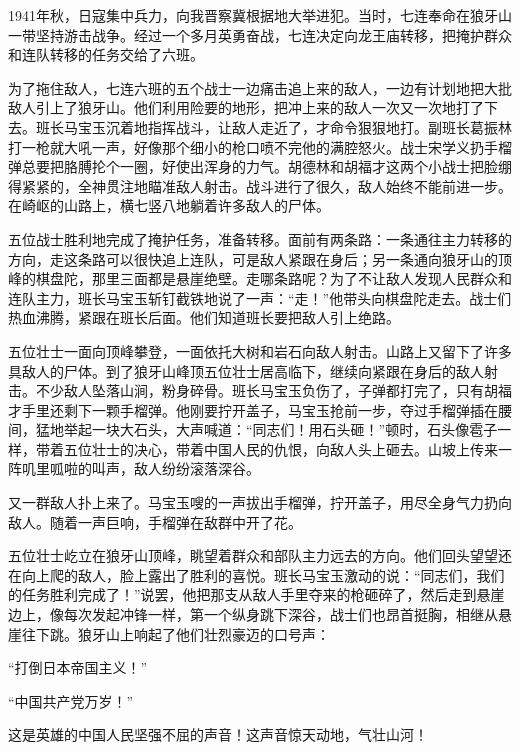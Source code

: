 \documentclass[12pt,UTF-8,openany]{ctexbook}
\begin{document}
\begin{large}
    
    1941年秋，日寇集中兵力，向我晋察冀根据地大举进犯。当时，七连奉命在狼牙山一带坚持游击战争。经过一个多月英勇奋战，七连决定向龙王庙转移，把掩护群众和连队转移的任务交给了六班。
    
    为了拖住敌人，七连六班的五个战士一边痛击追上来的敌人，一边有计划地把大批敌人引上了狼牙山。他们利用险要的地形，把冲上来的敌人一次又一次地打了下去。班长马宝玉沉着地指挥战斗，让敌人走近了，才命令狠狠地打。副班长葛振林打一枪就大吼一声，好像那个细小的枪口喷不完他的满腔怒火。战士宋学义扔手榴弹总要把胳膊抡个一圈，好使出浑身的力气。胡德林和胡福才这两个小战士把脸绷得紧紧的，全神贯注地瞄准敌人射击。战斗进行了很久，敌人始终不能前进一步。在崎岖的山路上，横七竖八地躺着许多敌人的尸体。
    
    五位战士胜利地完成了掩护任务，准备转移。面前有两条路：一条通往主力转移的方向，走这条路可以很快追上连队，可是敌人紧跟在身后；另一条通向狼牙山的顶峰的棋盘陀，那里三面都是悬崖绝壁。走哪条路呢？为了不让敌人发现人民群众和连队主力，班长马宝玉斩钉截铁地说了一声：“走！”他带头向棋盘陀走去。战士们热血沸腾，紧跟在班长后面。他们知道班长要把敌人引上绝路。
    
    五位壮士一面向顶峰攀登，一面依托大树和岩石向敌人射击。山路上又留下了许多具敌人的尸体。到了狼牙山峰顶五位壮士居高临下，继续向紧跟在身后的敌人射击。不少敌人坠落山涧，粉身碎骨。班长马宝玉负伤了，子弹都打完了，只有胡福才手里还剩下一颗手榴弹。他刚要拧开盖子，马宝玉抢前一步，夺过手榴弹插在腰间，猛地举起一块大石头，大声喊道：“同志们！用石头砸！”顿时，石头像雹子一样，带着五位壮士的决心，带着中国人民的仇恨，向敌人头上砸去。山坡上传来一阵叽里呱啦的叫声，敌人纷纷滚落深谷。
    
    又一群敌人扑上来了。马宝玉嗖的一声拔出手榴弹，拧开盖子，用尽全身气力扔向敌人。随着一声巨响，手榴弹在敌群中开了花。
    
    五位壮士屹立在狼牙山顶峰，眺望着群众和部队主力远去的方向。他们回头望望还在向上爬的敌人，脸上露出了胜利的喜悦。班长马宝玉激动的说：“同志们，我们的任务胜利完成了！”说罢，他把那支从敌人手里夺来的枪砸碎了，然后走到悬崖边上，像每次发起冲锋一样，第一个纵身跳下深谷，战士们也昂首挺胸，相继从悬崖往下跳。狼牙山上响起了他们壮烈豪迈的口号声：
    
    “打倒日本帝国主义！”
    
    “中国共产党万岁！”
    
    这是英雄的中国人民坚强不屈的声音！这声音惊天动地，气壮山河！
    
\end{large}
\end{document}
